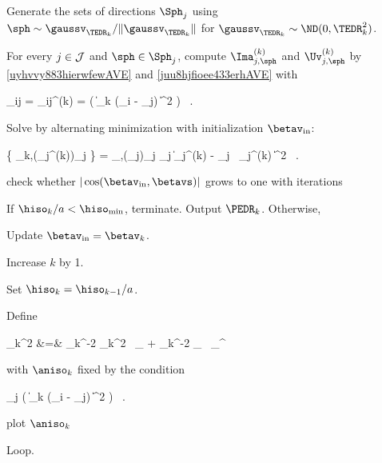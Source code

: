 \begin{mylist}

\item
Generate the sets of directions \( \Sph_{j} \) using 
\( \sph \sim \gaussv_{\TEDR_{k}}/\| \gaussv_{\TEDR_{k}} \| \) for \( \gaussv_{\TEDR_{k}} \sim \ND(0,\TEDR_{k}^{2}) \).

\item 
For every \( j \in \mathcal{J} \) and \( \sph \in \Sph_{j} \), compute \( \Ima_{j,\sph}^{(k)} \) and \( \Uv_{j,\sph}^{(k)} \) by \eqref{uyhvvy883hierwfewAVE} and \eqref{juu8hjfioee433erhAVE} 
with 
\begin{EQA}[c]
	\weight_{ij} 
	= 
	\weight_{ij}^{(k)}
	= 
	\Kern\bigl( \| \TEDR_{k} (\Xv_{i} - \xv_{j}) \|^{2} \bigr) 
	\, .
\end{EQA}

\item 
Solve by alternating minimization with initialization \( \betav_{\init} \):
\begin{EQA}[c]
	\{ \betav_{k},(\fcl_{j}^{(k)})_{j \in \JJJ} \} 
	=
	\arginf_{\betav,(\fcl_{j})_{j \in \JJJ}} 
	\sum_{j \in \JJJ} \bigl\| \Imav_{j}^{(k)} - \fcl_{j} \, \UV_{j}^{(k)} \betav \bigr\|^{2}
	\, .
\end{EQA}

{\color{blue} check whether \( |\cos(\betav_{\init},\betavs)| \) grows to one with iterations}
\item
If \( \hiso_{k} / a < \hiso_{\min} \), terminate. Output \( \PEDR_{k} \).
Otherwise,
\begin{mylist}
\item 
Update \( \betav_{\init} = \betav_{k} \).

\item
Increase \( k \) by 1.

\item 
Set \( \hiso_{k} = \hiso_{k-1} / a \).

\item 
Define 
\begin{EQA}[rcl]
	\TEDR_{k}^{2}
	&=&
	\hiso_{k}^{-2} \aniso_{k}^{2} \, \Id_{\dimd} + \hiso_{k}^{-2} \betav_{\init} \, \betav_{\init}^{\T}
	\, 
\label{iufhvu8kjbmnll475eAVE}
\end{EQA}
with \( \aniso_{k} \) fixed by the condition
\begin{EQA}[c]
	 \sum_{j \in \JJJ} \sumi 
		\Kern\bigl( \| \TEDR_{k} (\Xv_{i} - \xv_{j}) \|^{2} \bigr)
	\geq 
	\nmin
	\, .
\label{jhgiverkytde4w34etyAVE}
\end{EQA}
{\color{blue} plot \( \aniso_{k} \)}
\end{mylist}


\item Loop.

%
\end{mylist}


